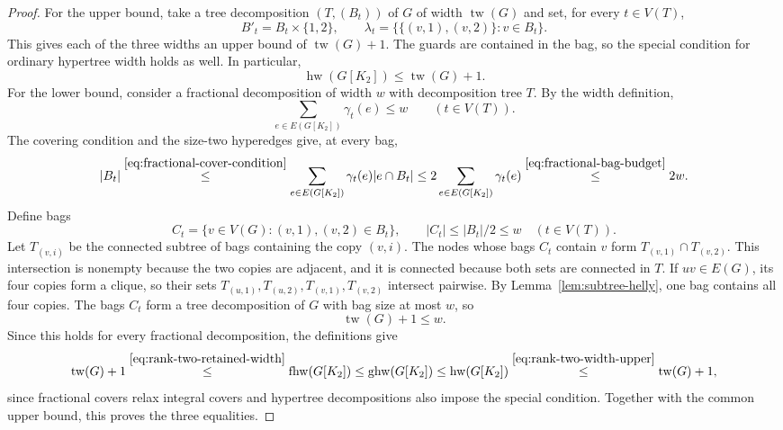 \begin{proof}
For the upper bound, take a tree decomposition $(T,(B_t))$ of $G$
of width $\operatorname{tw}(G)$ and set, for every $t\in V(T)$,
\[
 B'_t=B_t\times\{1,2\},\qquad
 \lambda_t=\{\{(v,1),(v,2)\}:v\in B_t\}.
\]
This gives each of
the three widths an upper bound of $\operatorname{tw}(G)+1$.
The guards are contained in the bag, so the special condition for
ordinary hypertree width holds as well. In particular,
\begin{equation}\label{eq:rank-two-width-upper}
 \operatorname{hw}(G[K_2])\leq\operatorname{tw}(G)+1.
\end{equation}
For the lower bound, consider a fractional decomposition of width
$w$ with decomposition tree $T$. By the width definition,
\begin{equation}\label{eq:fractional-bag-budget}
 \sum_{e\in E(G[K_2])}\gamma_t(e)\leq w\qquad(t\in V(T)).
\end{equation}
The covering condition and the size-two hyperedges give, at every bag,
\[
 |B_t|\overset{\eqref{eq:fractional-cover-condition}}{\leq}
       \sum_{e\in E(G[K_2])}\gamma_t(e)|e\cap B_t|
 \leq2\sum_{e\in E(G[K_2])}\gamma_t(e)
       \overset{\eqref{eq:fractional-bag-budget}}{\leq}2w.
\]
Define bags
\[
 C_t=\{v\in V(G):(v,1),(v,2)\in B_t\},\qquad
 |C_t|\leq |B_t|/2\leq w\quad(t\in V(T)).
\]
Let $T_{(v,i)}$ be the
connected subtree of bags containing the copy $(v,i)$. The nodes whose
bags $C_t$ contain $v$ form
$T_{(v,1)}\cap T_{(v,2)}$. This intersection is nonempty because
the two copies are adjacent, and it is connected because both sets
are connected in $T$. If $uv\in E(G)$, its four copies form a clique,
so their sets $T_{(u,1)},T_{(u,2)},T_{(v,1)},T_{(v,2)}$ intersect pairwise.
By Lemma~\ref{lem:subtree-helly}, one bag contains
all four copies. The bags $C_t$ form
a tree decomposition of $G$ with bag size at most $w$, so
\begin{equation}\label{eq:rank-two-retained-width}
 \operatorname{tw}(G)+1\leq w.
\end{equation}
Since this holds for every fractional decomposition, the definitions give
\[
\operatorname{tw}(G)+1
 \overset{\eqref{eq:rank-two-retained-width}}{\leq}\operatorname{fhw}(G[K_2])
 \leq\operatorname{ghw}(G[K_2])\leq\operatorname{hw}(G[K_2]) \overset{\eqref{eq:rank-two-width-upper}}{\leq}\operatorname{tw}(G)+1,
\]
since fractional covers relax integral covers and hypertree
decompositions also impose the special condition. Together with the
common upper bound, this proves the three equalities.
\end{proof}

